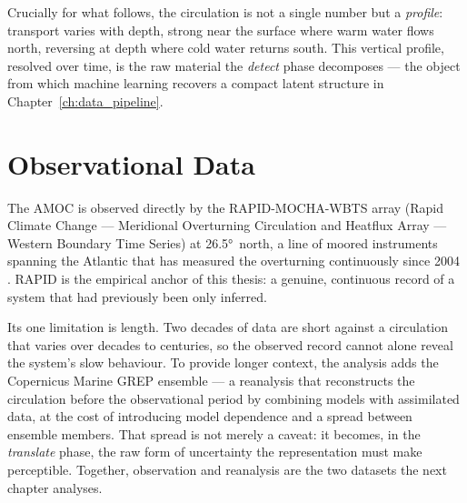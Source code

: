 Crucially for what follows, the circulation is not a single number but a \emph{profile}: transport varies with depth, strong near the surface where warm water flows north, reversing at depth where cold water returns south. This vertical profile, resolved over time, is the raw material the \emph{detect} phase decomposes --- the object from which machine learning recovers a compact latent structure in Chapter~\ref{ch:data_pipeline}.

\section{Observational Data}
\label{sec:bg-data}

The AMOC is observed directly by the RAPID-MOCHA-WBTS array (Rapid Climate Change --- Meridional Overturning Circulation and Heatflux Array --- Western Boundary Time Series) at \ang{26.5}~north, a line of moored instruments spanning the Atlantic that has measured the overturning continuously since 2004 \citep{frajkawilliams2021, moat2026}. RAPID is the empirical anchor of this thesis: a genuine, continuous record of a system that had previously been only inferred.

Its one limitation is length. Two decades of data are short against a circulation that varies over decades to centuries, so the observed record cannot alone reveal the system's slow behaviour. To provide longer context, the analysis adds the Copernicus Marine GREP ensemble --- a reanalysis that reconstructs the circulation before the observational period by combining models with assimilated data, at the cost of introducing model dependence and a spread between ensemble members. That spread is not merely a caveat: it becomes, in the \emph{translate} phase, the raw form of uncertainty the representation must make perceptible. Together, observation and reanalysis are the two datasets the next chapter analyses.